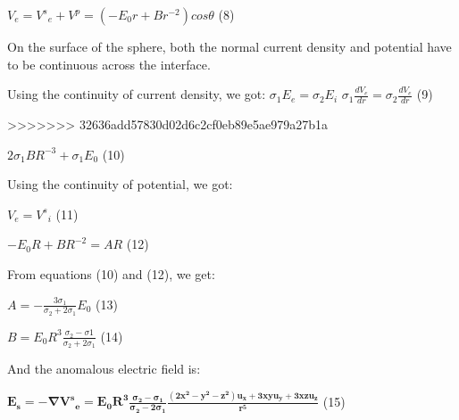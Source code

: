 \documentclass[11pt,letterpaper,leqno]{amsart}
\numberwithin{equation}{section}
\begin{document}
 \vspace{0.4cm}


$V_e= {V^s}_e + {V^p} = (-E_0 r + B r^{-2}) cos \theta$ \quad (8)


 \vspace{0.4cm}


On the surface of the sphere, both the normal current density and potential have to be continuous across the interface.

 \vspace{0.4cm}


Using the continuity of current density, we got:
$\sigma_1 E_e = \sigma_2 E_i$ \quad $\sigma_1 \frac{dV_e}{dr} = \sigma_2 \frac{dV_e}{dr} $ \quad (9)

 \vspace{0.4cm}


>>>>>>> 32636add57830d02d6c2cf0eb89e5ae979a27b1a

$2 \sigma_1 B R^{-3} + \sigma_1 E_0$ \quad (10)


 \vspace{0.4cm}


Using the continuity of potential, we got:

 \vspace{0.4cm}


${V_e}={V^s}_i$	\quad (11)

 \vspace{0.4cm}


$-E_0 R + B R^{-2} = A R$ \quad (12)

 \vspace{0.4cm}


From equations (10) and (12), we get:

 \vspace{0.4cm}


$A=-\frac{3 \sigma_1}{\sigma_2 + 2\sigma_1} E_0 $ \quad (13)

 \vspace{0.4cm}


$B=E_0 R^3 \frac{\sigma_2-\sigma1}{\sigma_2+2\sigma_1} $ \quad (14)

 \vspace{0.4cm}


And the anomalous electric field is:

 \vspace{0.4cm}


$\mathbf{E_s=-\nabla{V^s}_e=E_0 R^3 \frac{\sigma_2-\sigma_1}{\sigma_2 - 2\sigma_1} \frac{(2x^2-y^2-z^2)\mathbf{u}_x + 3xy \mathbf{u}_y + 3xz \mathbf{u}_z}{r^5}} $ \quad (15)
\end{document}
